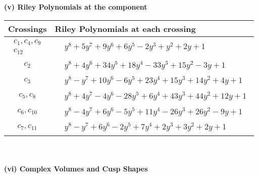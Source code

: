 \documentclass[1p]{elsarticle_modified}
\theoremstyle{definition}
\begin{document}
\newpage\renewcommand{\arraystretch}{1}
\flushleft \textbf{(v) Riley Polynomials at the component}\newline \\
\begin{tabular}{m{50pt}|m{274pt}}
Crossings & \hspace{64pt}Riley Polynomials at each crossing \\
\hline $$\begin{aligned}c_{1},c_{4},c_{9}\\c_{12}\end{aligned}$$&$\begin{aligned}
&y^8+5 y^7+9 y^6+6 y^5-2 y^3+y^2+2 y+1
\end{aligned}$\\
\hline $$\begin{aligned}c_{2}\end{aligned}$$&$\begin{aligned}
&y^8+4 y^6+34 y^5+18 y^4-33 y^3+15 y^2-3 y+1
\end{aligned}$\\
\hline $$\begin{aligned}c_{3}\end{aligned}$$&$\begin{aligned}
&y^8- y^7+10 y^6-6 y^5+23 y^4+15 y^3+14 y^2+4 y+1
\end{aligned}$\\
\hline $$\begin{aligned}c_{5},c_{8}\end{aligned}$$&$\begin{aligned}
&y^8+4 y^7-4 y^6-28 y^5+6 y^4+43 y^3+44 y^2+12 y+1
\end{aligned}$\\
\hline $$\begin{aligned}c_{6},c_{10}\end{aligned}$$&$\begin{aligned}
&y^8-4 y^7+6 y^6-5 y^5+11 y^4-26 y^3+26 y^2-9 y+1
\end{aligned}$\\
\hline $$\begin{aligned}c_{7},c_{11}\end{aligned}$$&$\begin{aligned}
&y^8- y^7+6 y^6-2 y^5+7 y^4+2 y^3+3 y^2+2 y+1
\end{aligned}$\\
\hline
\end{tabular}\\~\\
\newpage\flushleft \textbf{(vi) Complex Volumes and Cusp Shapes}
\end{document}
